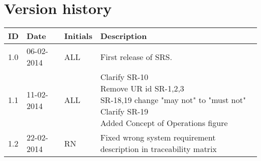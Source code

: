 \documentclass[Main]{subfiles}
\begin{document}
\section*{Version history}

\begin{tabular}{p{} p{} p{} p{}}
\hline
\textbf{ID} & \textbf{Date} & \textbf{Initials} & \textbf{Description}
\\
\hline
1.0 & 06-02-2014 & ALL & First release of SRS.
\\ 
1.1 & 11-02-2014 & ALL & \parbox[t]{0.7\textwidth}{
Clarify SR-10 \\
Remove UR id SR-1,2,3 \\
SR-18,19 change "may not" to "must not" \\
Clarify SR-19\\
Added Concept of Operations figure\\
} \\
1.2 & 22-02-2014 & RN & Fixed wrong system requirement description in traceability matrix \\
\hline 
\end{tabular} 
\end{document}

